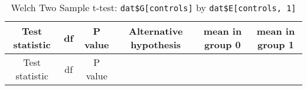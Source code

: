\documentclass[11pt,]{article}
\newenvironment{Shaded}{\begin{snugshade}}{\end{snugshade}}
\newcommand{\KeywordTok}[1]{\textcolor[rgb]{0.13,0.29,0.53}{\textbf{#1}}}
\newcommand{\DataTypeTok}[1]{\textcolor[rgb]{0.13,0.29,0.53}{#1}}
\newcommand{\DecValTok}[1]{\textcolor[rgb]{0.00,0.00,0.81}{#1}}
\newcommand{\StringTok}[1]{\textcolor[rgb]{0.31,0.60,0.02}{#1}}
\newcommand{\OperatorTok}[1]{\textcolor[rgb]{0.81,0.36,0.00}{\textbf{#1}}}
\newcommand{\NormalTok}[1]{#1}
\begin{document}
\begin{Shaded}
\end{Shaded}

\begin{longtable}[]{@{}cccccc@{}}
\caption{Welch Two Sample t-test: \texttt{dat\$G{[}controls{]}} by
\texttt{dat\$E{[}controls,\ 1{]}}}\tabularnewline
\toprule
\begin{minipage}[b]{0.14\columnwidth}\centering\strut
Test statistic\strut
\end{minipage} & \begin{minipage}[b]{0.07\columnwidth}\centering\strut
df\strut
\end{minipage} & \begin{minipage}[b]{0.12\columnwidth}\centering\strut
P value\strut
\end{minipage} & \begin{minipage}[b]{0.16\columnwidth}\centering\strut
Alternative hypothesis\strut
\end{minipage} & \begin{minipage}[b]{0.12\columnwidth}\centering\strut
mean in group 0\strut
\end{minipage} & \begin{minipage}[b]{0.12\columnwidth}\centering\strut
mean in group 1\strut
\end{minipage}\tabularnewline
\midrule
\endfirsthead
\toprule
\begin{minipage}[b]{0.14\columnwidth}\centering\strut
Test statistic\strut
\end{minipage} & \begin{minipage}[b]{0.07\columnwidth}\centering\strut
df\strut
\end{minipage} & \begin{minipage}[b]{0.12\columnwidth}\centering\strut
P value\strut
\end{minipage} & \begin{minipage}[b]{0.16\columnwidth}\centering\strut

\end{minipage}
\end{longtable}
\end{document}
